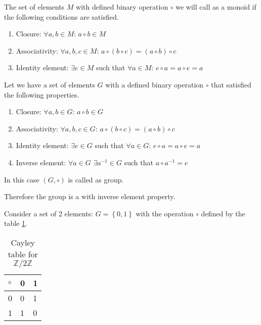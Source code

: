 \begin{appendices}
\begin{definition}[Monoid]
  The set of elements $M$ with defined binary operation $\circ$ we will call
  as a monoid if the following conditions are satisfied.
  \begin{enumerate}
  \item Closure: $\forall a, b \in M$: $a \circ b \in M$
  \item Associativity: $\forall a, b, c \in M$:
    $a \circ \left( b \circ c \right) =
    \left( a \circ b \right) \circ c$
  \item Identity element: $\exists e \in M$ such that
    $\forall a \in M$: $e \circ a = a \circ e = a$
  \end{enumerate}
  \label{def:monoid}
\end{definition}

\begin{definition}[Group]
  Let we have a set of elements $G$ with a defined binary operation
  $\circ$ that satisfied the following properties.
  \begin{enumerate}
  \item Closure: $\forall a, b \in G$: $a \circ b \in G$
  \item Associativity: $\forall a, b, c \in G$:
    $a \circ \left( b \circ c \right) =
    \left( a \circ b \right) \circ c$
  \item Identity element: $\exists e \in G$ such that
    $\forall a \in G$: $e \circ a = a \circ e = a$
  \item Inverse element: $\forall a \in G$ $\exists a^{-1} \in G$ such that
    $a \circ a^{-1} = e$
  \end{enumerate}
  In this case $\left(G, \circ\right)$ is called as group.
  \label{def:group}
\end{definition}
Therefore the group is a  with inverse element
property. 

\begin{example}
  Consider a set of 2 elements: $G = \left\{0, 1\right\}$ with the
  operation $\circ$ defined by the table \ref{tab:CayleyZ2Z}.
  \begin{table}
    \centering
    \caption{Cayley table for $\mathbb{Z}/2\mathbb{Z}$}
    \label{tab:CayleyZ2Z}
    \begin{tabular}{l|ll}
      \toprule
      $\circ$ & 0 & 1 \\
      \midrule
      0 & 0 & 1 \\
      1 & 1 & 0 \\
      \bottomrule
    \end{tabular}
  \end{table}


\end{example}
\end{appendices}
